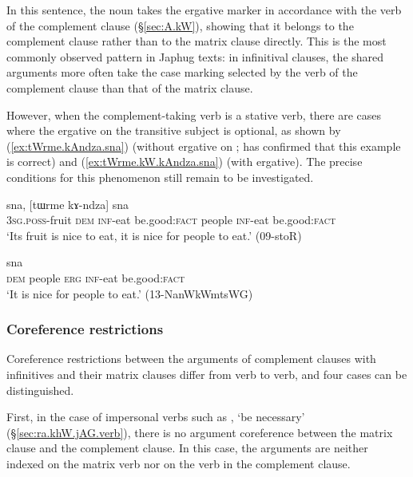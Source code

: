 In this sentence, the noun takes the ergative marker  in accordance with the verb of the complement clause (§\ref{sec:A.kW}), showing that it belongs to the complement clause rather than to the matrix clause directly. This is the most commonly observed pattern in Japhug texts: in infinitival clauses, the shared arguments more often take the case marking selected by the verb of the complement clause than that of the matrix clause.

However, when the com\-ple\-ment-taking verb is a stative verb, there are cases where the ergative on the transitive subject is optional, as shown by (\ref{ex:tWrme.kAndza.sna}) (without ergative on ;  has confirmed that this example is correct) and (\ref{ex:tWrme.kW.kAndza.sna}) (with ergative). The precise conditions for this phenomenon still remain to be investigated.

\begin{exe}
\ex \label{ex:tWrme.kAndza.sna}
 sna, [tɯrme kɤ-ndza] sna \\
\textsc{3sg}.\textsc{poss}-fruit \textsc{dem} \textsc{inf}-eat be.good:\textsc{fact} people \textsc{inf}-eat be.good:\textsc{fact} \\
\glt `Its fruit is nice to eat, it is nice for people to eat.' (09-stoR)
\end{exe}

\begin{exe}
\ex \label{ex:tWrme.kW.kAndza.sna}
 sna \\
\textsc{dem} people \textsc{erg} \textsc{inf}-eat be.good:\textsc{fact} \\
\glt `It is nice for people to eat.' (13-NanWkWmtsWG)
\end{exe}

\subsubsection{Coreference restrictions} \label{sec:velar.inf.coreference}

Coreference restrictions between the arguments of complement clauses with  infinitives and their matrix clauses differ from verb to verb, and four cases can be distinguished.

First, in the case of impersonal verbs such as , `be necessary' (§\ref{sec:ra.khW.jAG.verb}), there is no argument coreference between the matrix clause and the complement clause. In this case, the arguments are neither indexed on the matrix verb nor on the verb in the complement clause.

